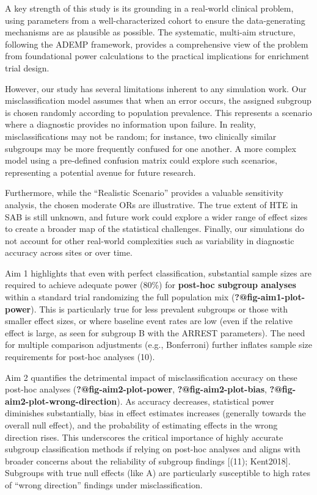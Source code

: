 \documentclass[
  letterpaper,
  DIV=11,
  numbers=noendperiod]{scrartcl}
\begin{document}
A key strength of this study is its grounding in a real-world clinical
problem, using parameters from a well-characterized cohort to ensure the
data-generating mechanisms are as plausible as possible. The systematic,
multi-aim structure, following the ADEMP framework, provides a
comprehensive view of the problem from foundational power calculations
to the practical implications for enrichment trial design.

However, our study has several limitations inherent to any simulation
work. Our misclassification model assumes that when an error occurs, the
assigned subgroup is chosen randomly according to population prevalence.
This represents a scenario where a diagnostic provides no information
upon failure. In reality, misclassifications may not be random; for
instance, two clinically similar subgroups may be more frequently
confused for one another. A more complex model using a pre-defined
confusion matrix could explore such scenarios, representing a potential
avenue for future research.

Furthermore, while the ``Realistic Scenario'' provides a valuable
sensitivity analysis, the chosen moderate ORs are illustrative. The true
extent of HTE in SAB is still unknown, and future work could explore a
wider range of effect sizes to create a broader map of the statistical
challenges. Finally, our simulations do not account for other real-world
complexities such as variability in diagnostic accuracy across sites or
over time.

Aim 1 highlights that even with perfect classification, substantial
sample sizes are required to achieve adequate power (80\%) for
\textbf{post-hoc subgroup analyses} within a standard trial randomizing
the full population mix (\textbf{?@fig-aim1-plot-power}). This is
particularly true for less prevalent subgroups or those with smaller
effect sizes, or where baseline event rates are low (even if the
relative effect is large, as seen for subgroup B with the ARREST
parameters). The need for multiple comparison adjustments (e.g.,
Bonferroni) further inflates sample size requirements for post-hoc
analyses (10).

Aim 2 quantifies the detrimental impact of misclassification accuracy on
these post-hoc analyses (\textbf{?@fig-aim2-plot-power},
\textbf{?@fig-aim2-plot-bias},
\textbf{?@fig-aim2-plot-wrong-direction}). As accuracy decreases,
statistical power diminishes substantially, bias in effect estimates
increases (generally towards the overall null effect), and the
probability of estimating effects in the wrong direction rises. This
underscores the critical importance of highly accurate subgroup
classification methods if relying on post-hoc analyses and aligns with
broader concerns about the reliability of subgroup findings {[}(11);
Kent2018{]}. Subgroups with true null effects (like A) are particularly
susceptible to high rates of ``wrong direction'' findings under
misclassification.
\end{document}
